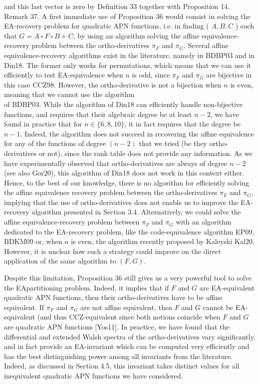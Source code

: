 \documentclass[10pt]{article}
\begin{document}
and this last vector is zero by Definition 33 together with Proposition 14.\\
Remark 37. A first immediate use of Proposition 36 would consist in solving the EA-recovery problem for quadratic APN functions, i.e. in finding ( $A, B, C$ ) such that $G=A \circ F \circ B+C$, by using an algorithm solving the affine equivalence-recovery problem between the ortho-derivatives $\pi_{F}$ and $\pi_{G}$. Several affine equivalence-recovery algorithms exist in the literature, namely in BDBP03 and in Din18. The former only works for permutations, which means that we can use it efficiently to test EA-equivalence when $n$ is odd, since $\pi_{F}$ and $\pi_{G}$ are bijective in this case CCZ98. However, the ortho-derivative is not a bijection when $n$ is even, meaning that we cannot use the algorithm\\
of BDBP03. While the algorithm of Din18 can efficiently handle non-bijective functions, and requires that their algebraic degree be at least $n-2$, we have found in practice that for $n \in\{6,8,10\}$, it in fact requires that the degree be $n-1$. Indeed, the algorithm does not succeed in recovering the affine equivalence for any of the functions of degree $(n-2)$ that we tried (be they ortho-derivatives or not), since the rank table does not provide any information. As we have experimentally observed that ortho-derivatives are always of degree $n-2$ (see also Gor20), this algorithm of Din18 does not work in this context either. Hence, to the best of our knowledge, there is no algorithm for efficiently solving the affine equivalence recovery problem between the ortho-derivatives $\pi_{F}$ and $\pi_{G}$, implying that the use of ortho-derivatives does not enable us to improve the EA-recovery algorithm presented in Section 3.4. Alternatively, we could solve the affine equivalence-recovery problem between $\pi_{F}$ and $\pi_{G}$ with an algorithm dedicated to the EA-recovery problem, like the code-equivalence algorithm EP09, BDKM09 or, when $n$ is even, the algorithm recently proposed by Kaleyski Kal20. However, it is unclear how such a strategy could improve on the direct application of the same algorithm to $(F, G)$.

Despite this limitation, Proposition 36 still gives us a very powerful tool to solve the EApartitioning problem. Indeed, it implies that if $F$ and $G$ are EA-equivalent quadratic APN functions, then their ortho-derivatives have to be affine equivalent. If $\pi_{F}$ and $\pi_{G}$ are not affine equivalent, then $F$ and $G$ cannot be EA-equivalent (and thus CCZ-equivalent since both notions coincide when $F$ and $G$ are quadratic APN functions [Yos11]. In practice, we have found that the differential and extended Walsh spectra of the ortho-derivatives vary significantly, and in fact provide an EA-invariant which can be computed very efficiently and has the best distinguishing power among all invariants from the literature. Indeed, as discussed in Section 4.5, this invariant takes distinct values for all inequivalent quadratic APN functions we have considered.
\end{document}
